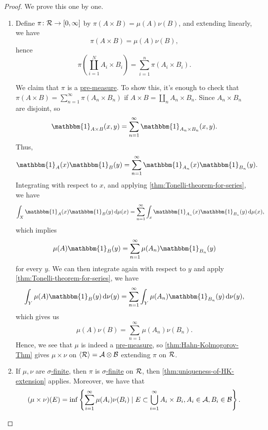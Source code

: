 \begin{proof}
	We prove this one by one.
	\begin{enumerate}[(1)]
		\item Define \(\pi \colon \mathcal{\MakeUppercase{r}} \to [0, \infty ]\) by \(\pi (A \times B) = \mu (A)\nu (B)\), and extending linearly, we have
		      \[
			      \pi (A\times B) = \mu (A)\nu (B),
		      \]
		      hence
		      \[
			      \pi \left(\coprod\limits_{i=1}^{N} A_{i} \times B_{i} \right) = \sum\limits_{i=1}^{n} \pi (A_{i} \times B_{i}).
		      \]

		      We claim that \(\pi \) is a \hyperref[def:pre-measure]{pre-measure}. To show this, it's enough to check that \(\pi (A\times B) = \sum\limits_{n=1}^{\infty} \pi (A_{n} \times B_{n} )\)
		      if \(A\times B = \coprod\limits_{n}A_{n} \times B_{n}  \). Since \(A_{n} \times B_{n} \) are disjoint, so
		      \[
			      \mathbbm{1}_{A\times B}(x, y) = \sum\limits_{n=1}^{\infty} \mathbbm{1}_{A_{n} \times B_{n} }(x, y).
		      \]
		      Thus,
		      \[
			      \mathbbm{1}_{A} (x)\mathbbm{1}_{B} (y) = \sum\limits_{n=1}^{\infty} \mathbbm{1}_{A_{n} }(x)\mathbbm{1}_{B_{n}}(y).
		      \]
		      Integrating with respect to \(x\), and applying \autoref{thm:Tonelli-theorem-for-series}, we have
		      \[
			      \int _X \mathbbm{1}_{A} (x)\mathbbm{1}_{B}(y)\,\mathrm{d} \mu (x) = \sum\limits_{n=1}^{\infty} \int _x \mathbbm{1}_{A_{n} }(x)\mathbbm{1}_{B_{n} }(y)\,\mathrm{d} \mu (x),
		      \]
		      which implies
		      \[
			      \mu (A)\mathbbm{1}_{B} (y) = \sum\limits_{n=1}^{\infty} \mu (A_{n} )\mathbbm{1}_{B_{n} }(y)
		      \]
		      for every \(y\). We can then integrate again with respect to \(y\) and apply \autoref{thm:Tonelli-theorem-for-series}, we have
		      \[
			      \int _Y \mu (A)\mathbbm{1}_{B}(y)\,\mathrm{d} \nu (y) = \sum\limits_{n=1}^{\infty} \int _Y \mu (A_{n} )\mathbbm{1}_{B_{n} }(y)\,\mathrm{d} \nu (y),
		      \]
		      which gives us
		      \[
			      \mu (A)\nu (B) = \sum\limits_{n=1}^{\infty} \mu (A_{n} )\nu (B_{n} ).
		      \]
		      Hence, we see that \(\mu\) is indeed a \hyperref[def:pre-measure]{pre-measure}, so  \autoref{thm:Hahn-Kolmogorov-Thm} gives \(\mu \times \nu \) on \(\left< \mathcal{\MakeUppercase{r}}  \right> = \mathcal{\MakeUppercase{a}} \otimes \mathcal{\MakeUppercase{b}}  \)
		      extending \(\pi \) on \(\mathcal{\MakeUppercase{r}} \).
		\item If \(\mu , \nu \) are \hyperref[def:sigma-finite-measure]{\(\sigma\)-finite}, then \(\pi \) is  \hyperref[def:sigma-finite-measure]{\(\sigma\)-finite} on \(\mathcal{\MakeUppercase{r}} \), then
		      \autoref{thm:uniqueness-of-HK-extension} applies. Moreover, we have that
		      \[
			      (\mu \times \nu )(E) = \inf \left\{\sum\limits_{i=1}^{\infty} \mu (A_{i})\nu (B_{i})\mid E\subset \bigcup\limits_{i=1}^{\infty} A_{i} \times B_{i}, A_{i} \in \mathcal{\MakeUppercase{a}} , B_{i} \in \mathcal{\MakeUppercase{b}} \right\}.
		      \]
	\end{enumerate}
\end{proof}

